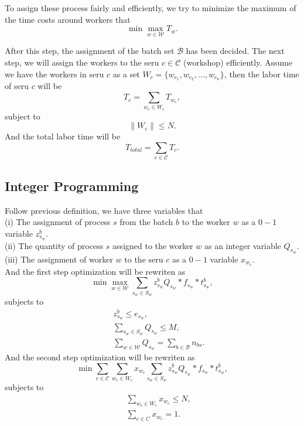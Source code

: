 \documentclass[10pt,reqno]{amsart}
\numberwithin{equation}{section}
\begin{document}
To assign these process fairly and efficiently, we try to minimize the maximum of the time costs around workers that
\begin{equation}\label{loss}
    \min\max_{w\in\mathcal{W}}T_w.
\end{equation}

After this step, the assignment of the batch set $\mathcal{B}$ has been decided. The next step, we will assign the workers to the seru $c\in\mathcal{C}$ (workshop) efficiently. Assume we have the workers in seru $c$ as a set $W_c = \{w_{c_1}, w_{c_2}, \ldots, w_{c_n}\}$, then the labor time of seru $c$ will be 
\begin{equation}\label{cost_c}
    T_c = \sum_{w_c\in W_c} T_{w_c},
\end{equation}
subject to 
\begin{equation}\label{subject_c}
    \|W_c\| \leq N.
\end{equation}
And the total labor time will be
\begin{equation}\label{total}
    T_{total} = \sum_{c\in\mathcal{C}}T_c.
\end{equation}
\subsection{Integer Programming}
Follow previous definition, we have three variables that\\
(i)   The assignment of process $s$ from the batch $b$ to the worker $w$ as a $0-1$ variable $z_{s_w}^{b}$.\\
(ii)  The quantity of process $s$ assigned to the worker $w$ as an integer variable $Q_{s_w}$.\\
(iii) The assignment of worker $w$ to the seru $c$ as a $0-1$ variable $x_{w_c}$.\\
And the first step optimization will be rewriten as
\begin{equation}\label{opt_1st}
    \min\max_{w\in\mathcal{W}}\sum_{s_w\in S_w}z_{s_w}^{b}Q_{s_w}*f_{s_w}*t^{b}_{s_w},
\end{equation}
subjects to
\begin{eqnarray}\label{subjects_1st}
    &&z^{b}_{s_w}\leq e_{s_w},\\
    &&\sum_{s_w\in S_w} Q_{s_w} \leq M,\\
    &&\sum_{w\in\mathcal{W}}Q_{s_w} = \sum_{b\in\mathcal{B}}n_{bs}.
\end{eqnarray}
And the second step optimization will be rewriten as
\begin{equation}\label{opt_2nd}
    \min\sum_{c\in \mathcal{C}}\sum_{w_c\in W_c}x_{w_c}\sum_{s_w\in S_w}z_{s_w}^{b}Q_{s_w}*f_{s_w}*t^{b}_{s_w},
\end{equation}
subjects to
\begin{eqnarray}\label{subjects}
    &&\sum_{w_c\in W_c} x_{w_c}\leq N,\\
    &&\sum_{c\in C} x_{w_c} = 1.
\end{eqnarray}



\end{document}
